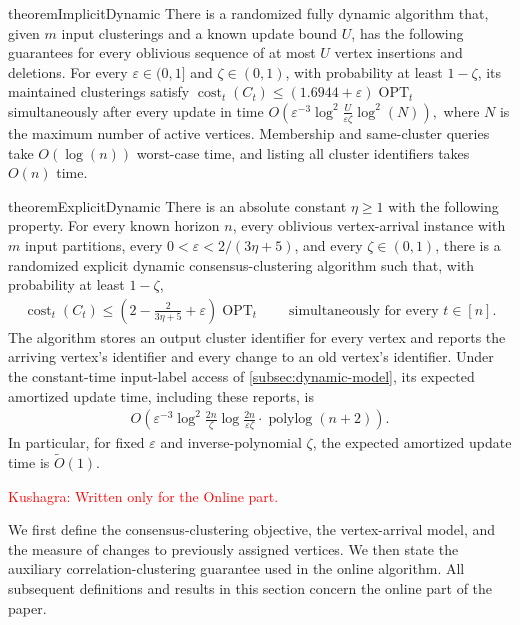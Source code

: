 \documentclass[11pt]{article}
\theoremstyle{definition}
\theoremstyle{remark}
\newcommand{\OPT}{\operatorname{OPT}}
\newcommand{\cost}{\operatorname{cost}}
\newcommand{\eps}{\varepsilon}
\newcommand{\1}{\mathbf{1}}
\newcommand{\polylog}{\operatorname{polylog}}
\newcommand{\Otilde}[1]{\widetilde{O}\left(#1\right)}
\newcommand{\kushagra}[1]{\textcolor{red}{\newline Kushagra: #1}}
\begin{document}
\begin{restatable}{theorem}{ImplicitDynamic}\label{thm:implicit-dynamic}
There is a randomized fully dynamic algorithm that, given $m$ input clusterings and a known update bound $U$, has the following guarantees for every oblivious sequence of
at most $U$ vertex insertions and deletions.
For every $\varepsilon\in(0,1]$ and $\zeta\in(0,1)$,
with probability at least $1-\zeta$, its maintained
clusterings satisfy
$\operatorname{cost}_t(C_t) \le (1.6944+\varepsilon)\operatorname{OPT}_t$
simultaneously after every update in time
$O\left(\varepsilon^{-3}\log^2\frac{U}{\varepsilon\zeta}\log^2(N)\right),$
where $N$ is the maximum number of active vertices. Membership and same-cluster queries take $O(\log(n))$ worst-case time, and listing all cluster identifiers takes $O(n)$ time.
\end{restatable}

\begin{restatable}{theorem}{ExplicitDynamic}\label{thm:explicit.dynamic}
There is an absolute constant $ \eta\ge1 $ with the following property.
For every known horizon $ n $, every oblivious vertex-arrival instance with $ m $ input partitions, every $ 0<\eps<2/(3\eta+5) $, and every $ \zeta\in(0,1) $, there is a randomized explicit dynamic consensus-clustering algorithm such that, with probability at least $ 1-\zeta $,
\begin{align}
    \cost_t(C_t)\le\left(2-\frac{2}{3\eta+5}+\eps\right)\OPT_t
    \qquad\text{simultaneously for every }t\in[n].
    \label{eq:explicit.dynamic.ratio}
\end{align}
The algorithm stores an output cluster identifier for every vertex and reports the arriving vertex's identifier and every change to an old vertex's identifier.
Under the constant-time input-label access of \cref{subsec:dynamic-model}, its expected amortized update time, including these reports, is
\begin{align}
    O\!\left(
        \eps^{-3}\log^2\frac{2n}{\zeta}
        \log\frac{2n}{\eps\zeta}\cdot\polylog(n+2)
    \right).
    \nonumber
\end{align}
In particular, for fixed $ \eps $ and inverse-polynomial $ \zeta $, the expected amortized update time is $ \Otilde{1} $.
\end{restatable}

\kushagra{Written only for the Online part.}

We first define the consensus-clustering objective, the vertex-arrival
model, and the measure of changes to previously assigned vertices.
We then state the auxiliary correlation-clustering guarantee used in the
online algorithm. All subsequent definitions and results in this section
concern the online part of the paper.
\end{document}
